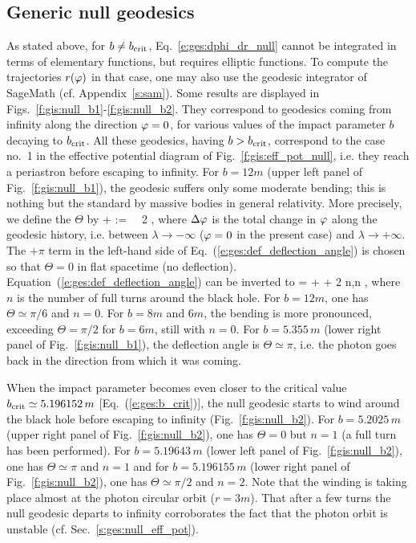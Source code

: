 \subsection{Generic null geodesics}

As stated above, for $b \not= b_{\rm crit}$, Eq.~\eqref{e:ges:dphi_dr_null} cannot be integrated
in terms of elementary functions, but requires elliptic functions.
To compute the trajectories $r(\varphi)$ in that case, one may also use the geodesic integrator
of \textsf{SageMath} (cf. Appendix~\ref{s:sam}). Some results are displayed in
Figs.~\ref{f:gis:null_b1}-\ref{f:gis:null_b2}. They correspond to
geodesics coming from infinity along the
direction $\varphi=0$, for various values of the
impact parameter $b$ decaying to $b_{\rm crit}$. All these geodesics, having
$b > b_{\rm crit}$, correspond to the case no.~1 in the effective potential
diagram of Fig.~\ref{f:gis:eff_pot_null}, i.e. they reach a periastron
before escaping to infinity. For $b=12 m$ (upper left panel of Fig.~\ref{f:gis:null_b1}),
the geodesic suffers only some moderate bending; this is nothing but the standard
 by massive bodies in
general relativity. More precisely, we define the 
$\Theta$ by
\be \label{e:ges:def_deflection_angle}
    \Theta + \pi := \Delta\ph \ \ 2 \pi,
\ee
where $\Delta\varphi$ is the total change in $\varphi$ along the geodesic history, i.e.
between $\lambda\to -\infty$ ($\varphi=0$ in the present case) and $\lambda\to +\infty$.
The $+\pi$ term in the left-hand side of Eq.~(\ref{e:ges:def_deflection_angle}) is chosen so
that $\Theta = 0$ in flat spacetime (no deflection).
Equation~(\ref{e:ges:def_deflection_angle}) can be
inverted to
\be \label{e:ges:Dph_Theta_n}
    \Delta\ph = \Theta + \pi + 2 \pi n,\qquad n\in {} ,
\ee
where $n$ is the number of full turns around the black hole.
For $b = 12 m$, one has $\Theta\simeq \pi/6$ and $n=0$.
For $b=8 m$ and $6 m$, the bending is more pronounced,
exceeding $\Theta = \pi/2$ for $b=6 m$, still with $n=0$. For $b=5.355\, m$ (lower right panel of Fig.~\ref{f:gis:null_b1}), the deflection angle is $\Theta\simeq\pi$, i.e. the photon goes back in the direction
from which it was coming.

When the impact parameter becomes even closer to the critical value
$b_{\rm crit}\simeq 5.196152\, m$ [Eq.~(\ref{e:ges:b_crit})],
the null geodesic starts to wind around the black hole before escaping
to infinity (Fig.~\ref{f:gis:null_b2}).
For $b=5.2025\, m$ (upper right panel of Fig.~\ref{f:gis:null_b2}), one has $\Theta=0$
but $n=1$ (a full turn has been performed). For $b=5.19643\, m$ (lower left panel
of Fig.~\ref{f:gis:null_b2}), one has
$\Theta\simeq\pi$ and $n=1$ and for $b=5.196155\, m$ (lower right panel of Fig.~\ref{f:gis:null_b2}), one has
$\Theta\simeq \pi/2$ and $n=2$.
Note that the winding is taking place
almost at the photon circular orbit ($r=3m$). That after a few turns the null geodesic
departs to infinity corroborates the fact that the photon orbit is unstable
(cf. Sec.~\ref{s:ges:null_eff_pot}).

